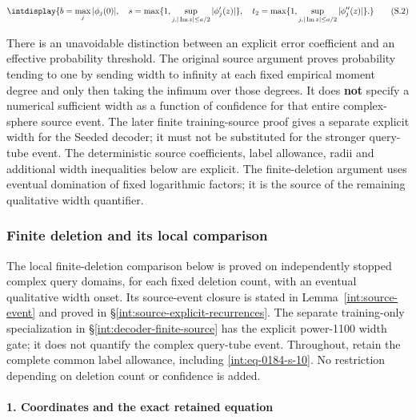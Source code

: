 \begingroup\renewcommand{\theHequation}{intdisplay.290}
\begin{equation}
\intdisplay{
b=\max_j|\phi_j(0)|,\quad
s=\max\{1,\sup_{j,|\operatorname{Im}z|\le a/2}|\phi_j'(z)|\},\quad
t_2=\max\{1,\sup_{j,|\operatorname{Im}z|\le a/2}|\phi_j''(z)|\}.
}
\tag{S.2}
\label{int:eq-0117-s-2}
\end{equation}
\endgroup


There is an unavoidable distinction between an explicit error coefficient and an effective probability threshold. The original source argument proves probability tending to one by sending width to infinity at each fixed empirical moment degree and only then taking the infimum over those degrees. It does \textbf{not} specify a numerical sufficient width as a function of confidence for that entire complex-sphere source event. The later finite training-source proof gives a separate explicit width for the Seeded decoder; it must not be substituted for the stronger query-tube event. The deterministic source coefficients, label allowance, radii and additional width inequalities below are explicit. The finite-deletion argument uses eventual domination of fixed logarithmic factors; it is the source of the remaining qualitative width quantifier.


\subsubsection{Finite deletion and its local comparison}
\label{int:source-local-insertion}


The local finite-deletion comparison below is proved on independently stopped complex query domains, for each fixed deletion count, with an eventual qualitative width onset. Its source-event closure is stated in Lemma~\ref{int:source-event} and proved in \S\ref{int:source-explicit-recurrences}. The separate training-only specialization in \S\ref{int:decoder-finite-source} has the explicit power-1100 width gate; it does not quantify the complex query-tube event. Throughout, retain the complete common label allowance, including \eqref{int:eq-0184-s-10}. No restriction depending on deletion count or confidence is added.


\paragraph{1. Coordinates and the exact retained equation}

